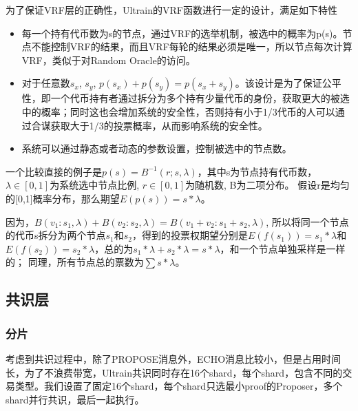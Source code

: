 \documentclass[12pt, UTF8]{article}
\begin{document}
为了保证VRF层的正确性，Ultrain的VRF函数进行一定的设计，满足如下特性
\begin{itemize}
\item 每一个持有代币数为s的节点，通过VRF的选举机制，被选中的概率为p(s)。节点不能控制VRF的结果，而且VRF每轮的结果必须是唯一，所以节点每次计算VRF，类似于对Random Oracle的访问。
\item 对于任意数$s_x$, $s_y$, $p(s_x)+p(s_y)=p(s_x+s_y)$。该设计是为了保证公平性，即一个代币持有者通过拆分为多个持有少量代币的身份，获取更大的被选中的概率；同时这也会增加系统的安全性，否则持有小于1/3代币的人可以通过合谋获取大于1/3的投票概率，从而影响系统的安全性。
\item 系统可以通过静态或者动态的参数设置，控制被选中的节点数。
\end{itemize}
一个比较直接的例子是$p(s)=B^{-1}(r; s, \lambda)$，其中s为节点持有代币数，$\lambda \in [0,1]$为系统选中节点比例, $r\in [0,1]$为随机数, B为二项分布。
假设r是均匀的[0,1]概率分布，那么期望$E(p(s))=s*\lambda$。

因为，$B(v_1:s_1, \lambda)+B(v_2:s_2, \lambda)=B(v_1+v_2: s_1+s_2, \lambda)$, 所以将同一个节点的代币s拆分为两个节点$s_1$和$s_2$，得到的投票权期望分别是$E(f(s_1))=s_1*\lambda$和$E(f(s_2))=s_2*\lambda$，总的为$s_1*\lambda+s_2*\lambda=s*\lambda$，和一个节点单独采样是一样的；
同理，所有节点总的票数为$\sum{s}*\lambda$。


\begin{comment}
Algorand算法中有点漏洞，首先在p比较小的时候，i大概率为0；另外，不应该是while循环，而是for循环。
\end{comment}


\subsection{共识层}
\subsubsection{分片}
考虑到共识过程中，除了PROPOSE消息外，ECHO消息比较小，但是占用时间长，为了不浪费带宽，Ultrain共识同时存在16个shard，每个shard，包含不同的交易类型。我们设置了固定16个shard，每个shard只选最小proof的Proposer，多个shard并行共识，最后一起执行。
\end{document}
